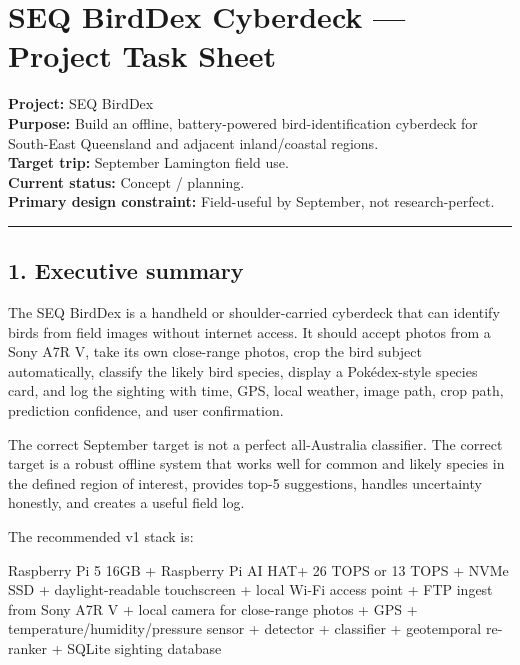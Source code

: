 \documentclass[
  11pt,
]{article}
\author{}
\date{}
\newenvironment{Shaded}{}{}
\newcommand{\NormalTok}[1]{#1}
\begin{document}
{
\hypersetup{linkcolor=}
\setcounter{tocdepth}{3}
\tableofcontents
}
\section{SEQ BirdDex Cyberdeck --- Project Task
Sheet}\label{seq-birddex-cyberdeck-project-task-sheet}

\textbf{Project:} SEQ BirdDex\\
\textbf{Purpose:} Build an offline, battery-powered bird-identification
cyberdeck for South-East Queensland and adjacent inland/coastal
regions.\\
\textbf{Target trip:} September Lamington field use.\\
\textbf{Current status:} Concept / planning.\\
\textbf{Primary design constraint:} Field-useful by September, not
research-perfect.

\begin{center}\rule{0.5\linewidth}{0.5pt}\end{center}

\subsection{1. Executive summary}\label{executive-summary}

The SEQ BirdDex is a handheld or shoulder-carried cyberdeck that can
identify birds from field images without internet access. It should
accept photos from a Sony A7R V, take its own close-range photos, crop
the bird subject automatically, classify the likely bird species,
display a Pokédex-style species card, and log the sighting with time,
GPS, local weather, image path, crop path, prediction confidence, and
user confirmation.

The correct September target is not a perfect all-Australia classifier.
The correct target is a robust offline system that works well for common
and likely species in the defined region of interest, provides top-5
suggestions, handles uncertainty honestly, and creates a useful field
log.

The recommended v1 stack is:

\begin{Shaded}
\begin{Highlighting}[]
\NormalTok{Raspberry Pi 5 16GB}
\NormalTok{+ Raspberry Pi AI HAT+ 26 TOPS or 13 TOPS}
\NormalTok{+ NVMe SSD}
\NormalTok{+ daylight{-}readable touchscreen}
\NormalTok{+ local Wi{-}Fi access point}
\NormalTok{+ FTP ingest from Sony A7R V}
\NormalTok{+ local camera for close{-}range photos}
\NormalTok{+ GPS + temperature/humidity/pressure sensor}
\NormalTok{+ detector + classifier + geotemporal re{-}ranker}
\NormalTok{+ SQLite sighting database}
\end{Highlighting}
\end{Shaded}
\end{document}
